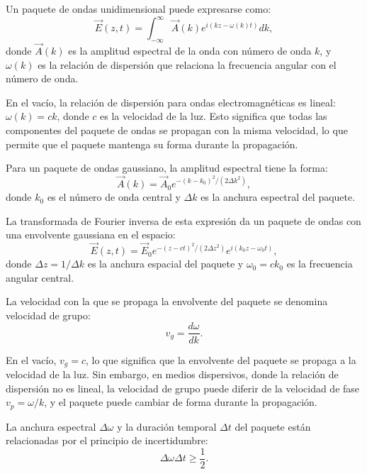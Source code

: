 \documentclass[12pt,a4paper]{book}
\begin{document}
Un paquete de ondas unidimensional puede expresarse como:
\begin{equation}
\vec{E}(z, t) = \int_{-\infty}^{\infty} \vec{A}(k) e^{i(kz - \omega(k)t)} dk,
\end{equation}
donde $\vec{A}(k)$ es la amplitud espectral de la onda con número de onda $k$, y $\omega(k)$ es la relación de dispersión que relaciona la frecuencia angular con el número de onda.

En el vacío, la relación de dispersión para ondas electromagnéticas es lineal: $\omega(k) = ck$, donde $c$ es la velocidad de la luz. Esto significa que todas las componentes del paquete de ondas se propagan con la misma velocidad, lo que permite que el paquete mantenga su forma durante la propagación.

Para un paquete de ondas gaussiano, la amplitud espectral tiene la forma:
\begin{equation}
\vec{A}(k) = \vec{A}_0 e^{-(k-k_0)^2/(2\Delta k^2)},
\end{equation}
donde $k_0$ es el número de onda central y $\Delta k$ es la anchura espectral del paquete.

La transformada de Fourier inversa de esta expresión da un paquete de ondas con una envolvente gaussiana en el espacio:
\begin{equation}
\vec{E}(z, t) = \vec{E}_0 e^{-(z-ct)^2/(2\Delta z^2)} e^{i(k_0 z - \omega_0 t)},
\end{equation}
donde $\Delta z = 1/\Delta k$ es la anchura espacial del paquete y $\omega_0 = ck_0$ es la frecuencia angular central.

La velocidad con la que se propaga la envolvente del paquete se denomina velocidad de grupo:
\begin{equation}
v_g = \frac{d\omega}{dk}.
\end{equation}

En el vacío, $v_g = c$, lo que significa que la envolvente del paquete se propaga a la velocidad de la luz. Sin embargo, en medios dispersivos, donde la relación de dispersión no es lineal, la velocidad de grupo puede diferir de la velocidad de fase $v_p = \omega/k$, y el paquete puede cambiar de forma durante la propagación.

La anchura espectral $\Delta \omega$ y la duración temporal $\Delta t$ del paquete están relacionadas por el principio de incertidumbre:
\begin{equation}
\Delta \omega \Delta t \geq \frac{1}{2}.
\end{equation}
\end{document}
